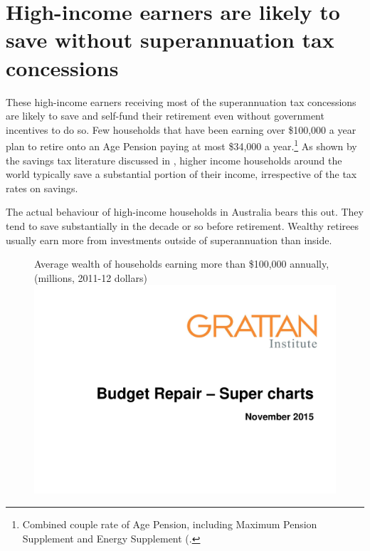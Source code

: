 \section{High-income earners are likely to save without superannuation tax concessions}\label{sec:SUPER-3-2}
These high-income earners receiving most of the superannuation tax concessions are likely to save and self-fund their retirement even without government incentives to do so. Few households that have been earning over \$100,000 a year plan to retire onto an Age Pension paying at most \$34,000 a year.\footnote{Combined couple rate of Age Pension, including Maximum Pension Supplement and Energy Supplement (\textcite{DHS2015IncomeTestForPensions}.}  As shown by the savings tax literature discussed in , higher income households around the world typically save a substantial portion of their income, irrespective of the tax rates on savings. 

The actual behaviour of high-income households in Australia bears this out. They tend to save substantially in the decade or so before retirement. Wealthy retirees usually earn more from investments outside of superannuation than inside. 

\begin{figure}
%
{Average wealth of households earning more than \$100,000 annually, (millions, 2011-12 dollars)}\label{fig:SUPER-3-2}
\includegraphics[width=\columnwidth,page=11]{super-atlas/PPTX.pdf}

\end{figure}

